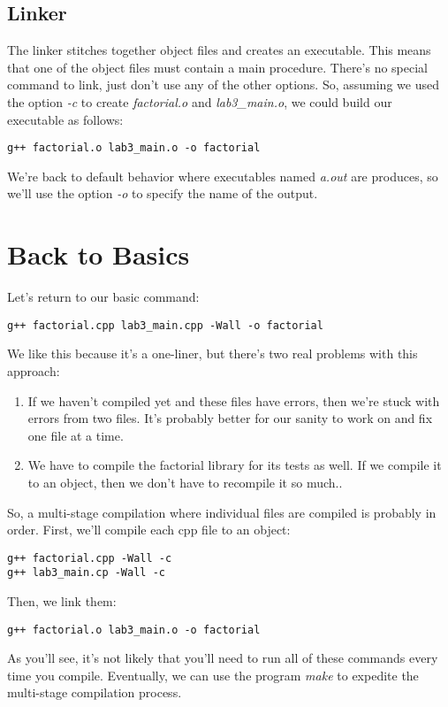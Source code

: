 \documentclass[]{tufte-handout}
\begin{document}
\subsection{Linker}

The linker stitches together object files and creates an executable.  This means that one of the object files must contain a main procedure.  There's no special command to link, just don't use any of the other options. So, assuming we used the option \textit{-c} to create \textit{factorial.o} and \textit{lab3\_main.o}, we could build our executable as follows:
\begin{verbatim}
g++ factorial.o lab3_main.o -o factorial
\end{verbatim}
We're back to default behavior where executables named \textit{a.out} are produces, so we'll use the option \textit{-o} to specify the name of the output. 

\section{Back to Basics}

Let's return to our basic command:
\begin{verbatim}
g++ factorial.cpp lab3_main.cpp -Wall -o factorial
\end{verbatim}
We like this because it's a one-liner, but there's two real problems with this approach:
\begin{enumerate}
\item If we haven't compiled yet and these files have errors, then we're stuck with errors from two files.  It's probably better for our sanity to work on and fix one file at a time.
\item We have to compile the factorial library for its tests as well.  If we compile it to an object, then we don't have to recompile it so much..
\end{enumerate} 

So, a multi-stage compilation where individual files are compiled is probably in order. First, we'll compile each cpp file to an object:
\begin{verbatim}
g++ factorial.cpp -Wall -c
g++ lab3_main.cp -Wall -c
\end{verbatim}
Then, we link them:
\begin{verbatim}
g++ factorial.o lab3_main.o -o factorial
\end{verbatim}
As you'll see, it's not likely that you'll need to run all of these commands every time you compile. Eventually, we can use the program \textit{make} to expedite the multi-stage compilation process.
\end{document}
